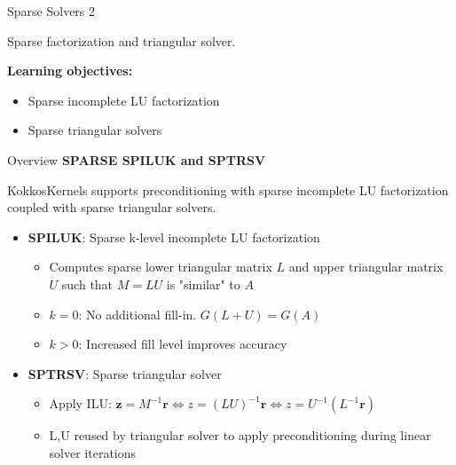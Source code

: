 
\begin{frame}[fragile]

  {\Huge Sparse Solvers 2}

  \vspace{10pt}

  {\large Sparse factorization and triangular solver.}

  \vspace{20pt}

  \textbf{Learning objectives:}
  \begin{itemize}
    \item {Sparse incomplete LU factorization}
    \item {Sparse triangular solvers}
  \end{itemize}

  \vspace{-20pt}

\end{frame}


\begin{frame}[fragile]{Overview}
\textbf{SPARSE SPILUK and SPTRSV}

KokkosKernels supports preconditioning with sparse incomplete LU factorization coupled with sparse triangular solvers.


\begin{itemize}
  \item \textbf{SPILUK}: Sparse k-level incomplete LU factorization
  \begin{itemize}
    \item Computes sparse lower triangular matrix $L$ and upper triangular matrix $U$ such that $M = LU$ is "similar" to $A$
    \item $k = 0$: No additional fill-in. $G(L+U) = G(A)$
    \item $k > 0$: Increased fill level improves accuracy
  \end{itemize}
  \vspace{1em}
  \item \textbf{SPTRSV}: Sparse triangular solver
  \begin{itemize}
    \item Apply ILU: $\mathbf{z} = M^{-1}\mathbf{r} \Leftrightarrow z = (LU)^{-1}\mathbf{r} \Leftrightarrow z = U^{-1}(L^{-1}\mathbf{r})$
    \item L,U reused by triangular solver to apply preconditioning during linear solver iterations
  \end{itemize}
\end{itemize}

\end{frame}


